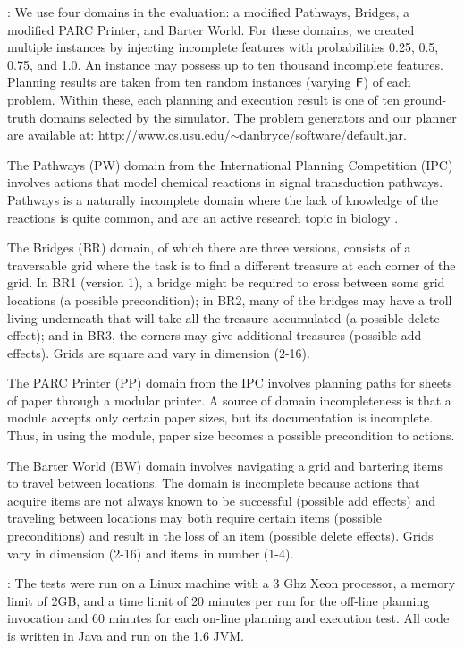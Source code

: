 \documentclass[letterpaper]{article}
\def\und#1{\noindent{\bf #1}:}
\def\citep#1{\cite{#1}}
\begin{document}
\und{Domains} We use four domains in the evaluation: a modified Pathways,
Bridges,  a modified PARC Printer, and Barter World.  For these  domains, we
created multiple instances by injecting incomplete features with probabilities
0.25, 0.5, 0.75, and 1.0. An instance may possess up to ten thousand
incomplete features.  Planning results are taken from ten random instances
(varying $\sf F$) of each problem. Within these, each planning and execution
result is one of ten ground-truth domains selected by the simulator. 
The problem generators and our planner are available at:
http://www.cs.usu.edu/$\sim$danbryce/software/default.jar.

The Pathways (PW) domain from the International Planning Competition  (IPC)
involves actions that model chemical reactions in signal transduction pathways. 
Pathways is a naturally incomplete domain where the lack of knowledge of the
reactions is quite common, and are an active research topic in
biology \citep{Choudhary15012006}.

The Bridges (BR) domain, of which there are three versions, consists of a
traversable grid where the task is to find a different treasure at each corner
of the grid. In BR1 (version 1), a bridge might be required  to cross between some
grid locations (a possible precondition);  in BR2, many of the
bridges may have a troll living underneath that will take all the treasure
accumulated (a possible delete effect); and  in BR3, the corners may
give additional treasures (possible add effects).  Grids are square and vary in
dimension (2-16).

The PARC Printer (PP) domain from the IPC involves planning paths for sheets of
paper through a modular printer.  A source of domain incompleteness is that a
module accepts only certain paper sizes, but its documentation is incomplete. 
Thus, in using the module, paper size becomes a possible precondition to
actions.

The Barter World (BW) domain involves navigating a grid and bartering items to
travel between locations.  The domain is incomplete because actions that acquire
 items are not always known to be successful (possible add effects) and
 traveling between locations may both require
certain items (possible preconditions) and  result in the loss of an
item (possible delete effects). Grids vary in dimension (2-16) and items in number
(1-4).




   

\und{Test Setup} The tests were run on a Linux machine with a 3 Ghz Xeon
processor, a memory limit of 2GB, and a time limit of 20 minutes per run for the
off-line planning invocation and 60 minutes for each on-line planning and
execution test.  All code is written in Java and run on the 1.6 JVM. 
\end{document}
